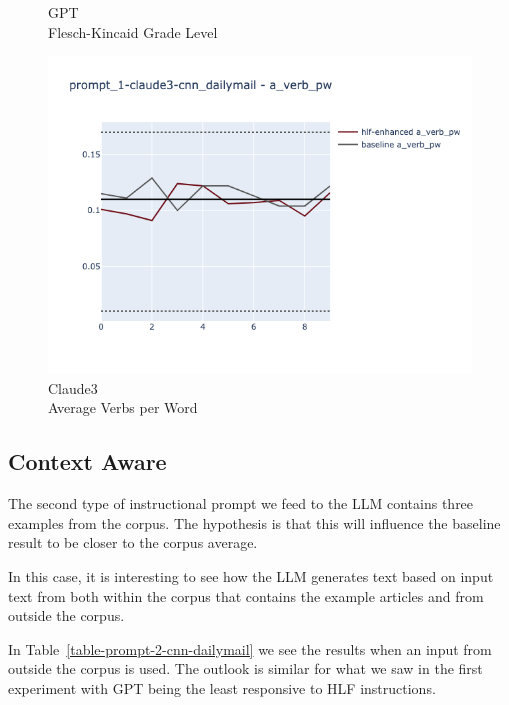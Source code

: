 \documentclass[runningheads,a4paper,11pt]{article}
\begin{document}
\begin{figure}[ht!]
\begin{minipage}{0.32\textwidth}
        \caption{GPT\\Flesch-Kincaid Grade Level}
        \label{fig-gpt-fkgl}
    \end{minipage}
    \hfill
    \begin{minipage}{0.32\textwidth}
        \includegraphics[width=\linewidth]{plots/prompt_1/prompt_1-claude3-cnn_dailymail/prompt_1-claude3-cnn_dailymail_a_verb_pw.png}
        \caption[center]{Claude3\\Average Verbs per Word}
        \label{fig-llama-simp-ttr}
    \end{minipage}
\end{figure}

\subsection{Context Aware}

The second type of instructional prompt we feed to the LLM contains three
examples from the corpus.
The hypothesis is that this will influence the baseline result to be closer to
the corpus average.

In this case, it is interesting to see how the LLM generates text based on input
text from both within the corpus that contains the example articles and from
outside the corpus.

In Table~\ref{table-prompt-2-cnn-dailymail} we see the results when an input from
outside the corpus is used.
The outlook is similar for what we saw in the first experiment with GPT
being the least responsive to HLF instructions.
\end{document}
